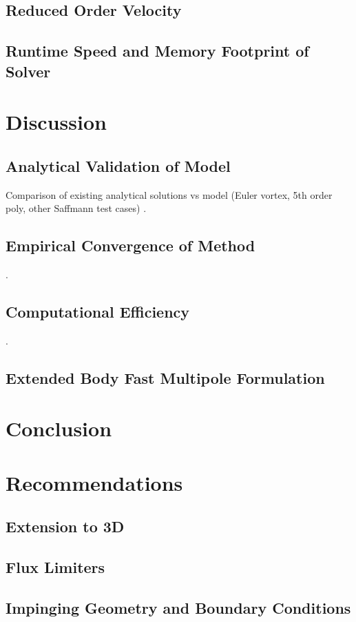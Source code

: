 \documentclass[letterpaper,12pt]{report}
\begin{document}
\section{Reduced Order Velocity}

\section{Runtime Speed and Memory Footprint of Solver}
\chapter{Discussion}
\section{Analytical Validation of Model}
Comparison of existing analytical solutions vs model (Euler vortex, 5th order poly, other Saffmann test cases)
\newpage.
\newpage
\section{Empirical Convergence of Method}
\newpage.
\newpage
\section{Computational Efficiency}
\newpage.
\newpage
\section{Extended Body Fast Multipole Formulation}
\chapter{Conclusion}
\chapter{Recommendations}
\section{Extension to 3D}
\section{Flux Limiters}
\section{Impinging Geometry and Boundary Conditions}
\end{document}
